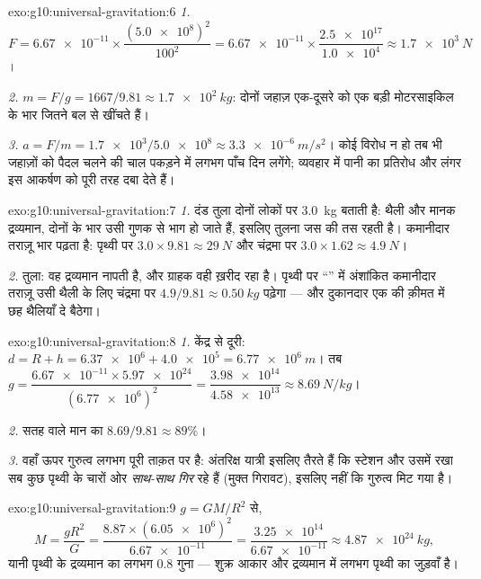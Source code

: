 \begin{solution}{exo:g10:universal-gravitation:6}
\emph{1.} $F = \num{6.67e-11} \times
\dfrac{(\num{5.0e8})^2}{100^2}
= \num{6.67e-11} \times \dfrac{\num{2.5e17}}{\num{1.0e4}}
\approx \qty{1.7e3}{N}$।

\emph{2.} $m = F/g = 1667/9.81 \approx \qty{1.7e2}{kg}$: दोनों जहाज़ एक-दूसरे को एक बड़ी मोटरसाइकिल के
भार जितने बल से खींचते हैं।

\emph{3.} $a = F/m = \num{1.7e3}/\num{5.0e8} \approx
\qty{3.3e-6}{m/s^2}$। कोई विरोध न हो तब भी जहाज़ों को पैदल चलने की चाल पकड़ने
में लगभग पाँच दिन लगेंगे; व्यवहार में पानी का प्रतिरोध और लंगर इस आकर्षण
को पूरी तरह दबा देते हैं।
\end{solution}

\begin{solution}{exo:g10:universal-gravitation:7}
\emph{1.} दंड तुला दोनों लोकों पर \qty{3.0}{kg} बताती है: थैली और मानक
द्रव्यमान, दोनों के भार उसी गुणक से भाग हो जाते हैं, इसलिए तुलना
जस की तस रहती है। कमानीदार तराज़ू भार पढ़ता है: पृथ्वी पर $3.0 \times 9.81 \approx \qty{29}{N}$
और चंद्रमा पर $3.0 \times 1.62 \approx \qty{4.9}{N}$।

\emph{2.} तुला: वह द्रव्यमान नापती है, और ग्राहक वही ख़रीद रहा है।
पृथ्वी पर ``'' में अंशांकित कमानीदार तराज़ू उसी थैली के
लिए चंद्रमा पर $4.9/9.81 \approx \qty{0.50}{kg}$ पढ़ेगा --- और दुकानदार एक की क़ीमत में छह थैलियाँ
दे बैठेगा।
\end{solution}

\begin{solution}{exo:g10:universal-gravitation:8}
\emph{1.} केंद्र से दूरी: $d = R + h = \num{6.37e6} + \num{4.0e5} = \qty{6.77e6}{m}$। तब $g = \dfrac{\num{6.67e-11} \times \num{5.97e24}}{(\num{6.77e6})^2}
= \dfrac{\num{3.98e14}}{\num{4.58e13}} \approx \qty{8.69}{N/kg}$।

\emph{2.} सतह वाले मान का $8.69/9.81 \approx 89\%$।

\emph{3.} वहाँ ऊपर गुरुत्व लगभग पूरी ताक़त पर है: अंतरिक्ष यात्री इसलिए
तैरते हैं कि स्टेशन और उसमें रखा सब कुछ पृथ्वी के चारों ओर \emph{साथ-साथ
गिर} रहे हैं (मुक्त गिरावट), इसलिए नहीं कि गुरुत्व मिट गया है।
\end{solution}

\begin{solution}{exo:g10:universal-gravitation:9}
$g = GM/R^2$ से,
\[
M = \frac{g R^2}{G}
= \frac{8.87 \times (\num{6.05e6})^2}{\num{6.67e-11}}
= \frac{\num{3.25e14}}{\num{6.67e-11}}
\approx \qty{4.87e24}{kg},
\]
यानी पृथ्वी के द्रव्यमान का लगभग $0.8$ गुना --- शुक्र आकार और
द्रव्यमान में लगभग पृथ्वी का जुड़वाँ है।
\end{solution}


